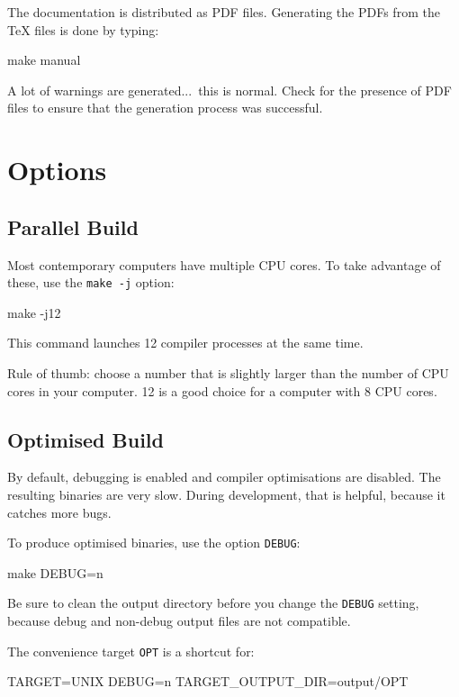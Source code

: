 The documentation is distributed as PDF files. Generating the PDFs from the 
TeX files is done by typing:

\begin{verbatim*}
make manual
\end{verbatim*}

A lot of warnings are generated...\ this is normal. Check for the presence of PDF files
to ensure that the generation process was successful.
\section{Options}

\subsection{Parallel Build}

Most contemporary computers have multiple CPU cores.  To take
advantage of these, use the \texttt{make -j} option:

\begin{verbatim*}
make -j12
\end{verbatim*}

This command launches 12 compiler processes at the same time.

Rule of thumb: choose a number that is slightly larger than the number
of CPU cores in your computer.  12 is a good choice for a computer
with 8 CPU cores.

\subsection{Optimised Build}

By default, debugging is enabled and compiler optimisations are
disabled.  The resulting binaries are very slow.  During development,
that is helpful, because it catches more bugs.

To produce optimised binaries, use the option \texttt{DEBUG}:

\begin{verbatim*}
make DEBUG=n
\end{verbatim*}

Be sure to clean the output directory before you change the
\texttt{DEBUG} setting, because debug and non-debug output files are
not compatible.

The convenience target \texttt{OPT} is a shortcut for:

\begin{verbatim*}
TARGET=UNIX DEBUG=n TARGET_OUTPUT_DIR=output/OPT
\end{verbatim*}

